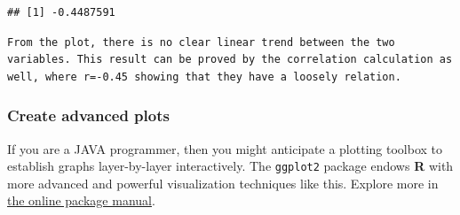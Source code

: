 \documentclass[
]{article}
\newenvironment{Shaded}{\begin{snugshade}}{\end{snugshade}}
\newcommand{\DataTypeTok}[1]{\textcolor[rgb]{0.13,0.29,0.53}{#1}}
\newcommand{\DecValTok}[1]{\textcolor[rgb]{0.00,0.00,0.81}{#1}}
\newcommand{\KeywordTok}[1]{\textcolor[rgb]{0.13,0.29,0.53}{\textbf{#1}}}
\newcommand{\NormalTok}[1]{#1}
\newcommand{\OperatorTok}[1]{\textcolor[rgb]{0.81,0.36,0.00}{\textbf{#1}}}
\newcommand{\StringTok}[1]{\textcolor[rgb]{0.31,0.60,0.02}{#1}}
\begin{document}
\begin{verbatim}
## [1] -0.4487591
\end{verbatim}

\begin{verbatim}
From the plot, there is no clear linear trend between the two variables. This result can be proved by the correlation calculation as well, where r=-0.45 showing that they have a loosely relation.
\end{verbatim}

\hypertarget{create-advanced-plots}{%
\subsubsection{Create advanced plots}\label{create-advanced-plots}}

If you are a JAVA programmer, then you might anticipate a plotting
toolbox to establish graphs layer-by-layer interactively. The
\texttt{ggplot2} package endows \textbf{R} with more advanced and
powerful visualization techniques like this. Explore more in
\href{https://cran.r-project.org/web/packages/ggplot2/ggplot2.pdf}{the
online package manual}.

\begin{Shaded}
\end{Shaded}
\end{document}
